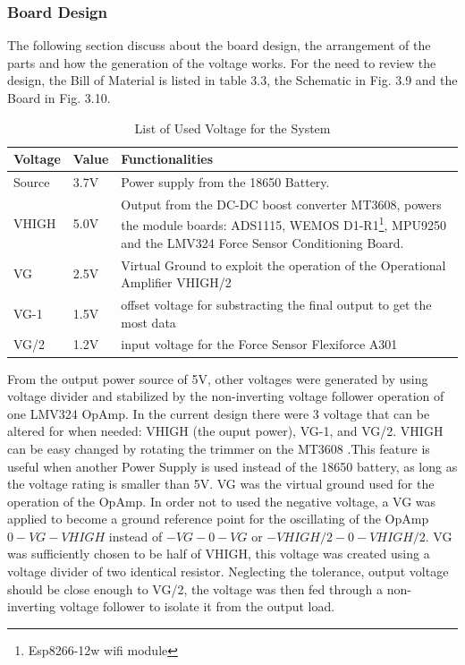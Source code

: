 \documentclass[12 pt, a4paper]{thesis}
\begin{document}
\subsubsection{Board Design}
The following section discuss about the board design, the arrangement of the parts and how the generation of the voltage works. For the need to review the design, the Bill of Material is listed in table 3.3, the Schematic in Fig. 3.9 and the Board in Fig. 3.10.\\
\begin{table}[hbt!]
\begin{center}
\begin{tabular}{ | m{2cm} | m{1cm}| m{12cm} |} 
\hline
Voltage & Value & Functionalities\\
\hline
Source & 3.7V & Power supply from the 18650 Battery.\\
\hline
VHIGH & 5.0V & Output from the DC-DC boost converter MT3608, powers the module boards: ADS1115, WEMOS D1-R1\footnote{Esp8266-12w wifi module}, MPU9250 and the LMV324 Force Sensor Conditioning Board. \\ 
\hline
VG & 2.5V & Virtual Ground to exploit the operation of the Operational Amplifier VHIGH/2 \\ 
\hline
VG-1 & 1.5V & offset voltage for substracting the final output to get the most data\\
\hline
VG/2 & 1.2V & input voltage for the Force Sensor Flexiforce A301 \\
\hline
\end{tabular}
\end{center}
\caption{List of Used Voltage for the System}
\end{table}
From the output power source of 5V, other voltages were generated by using voltage divider and stabilized by the non-inverting voltage follower operation of one LMV324 OpAmp. In the current design there were 3 voltage that can be altered for when needed: VHIGH (the ouput power), VG-1, and VG/2. VHIGH can be easy changed by rotating the trimmer on the MT3608 .This feature is useful when another Power Supply is used instead of the 18650 battery, as long as the voltage rating is smaller than 5V. VG was the virtual ground used for the operation of the OpAmp. In order not to used the negative voltage, a VG was applied to become a ground reference point for the oscillating of the OpAmp $0-VG-VHIGH$ instead of $-VG-0-VG$ or $-VHIGH/2-0-VHIGH/2$. VG was sufficiently chosen to be half of VHIGH, this voltage was created using a voltage divider of two identical resistor. Neglecting the tolerance, output voltage should be close enough to VG/2, the voltage was then fed through a non-inverting voltage follower to isolate it from the output load. \\
\end{document}
